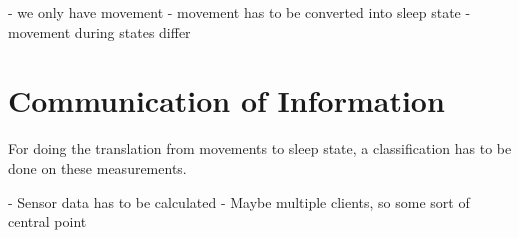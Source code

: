 - we only have movement
- movement has to be converted into sleep state
- movement during states differ


\section{Communication of Information} %
\label{sec:communicating_relevant_information}
For doing the translation from movements to sleep state, a classification has to be done on these measurements.

- Sensor data has to be calculated
- Maybe multiple clients, so some sort of central point

